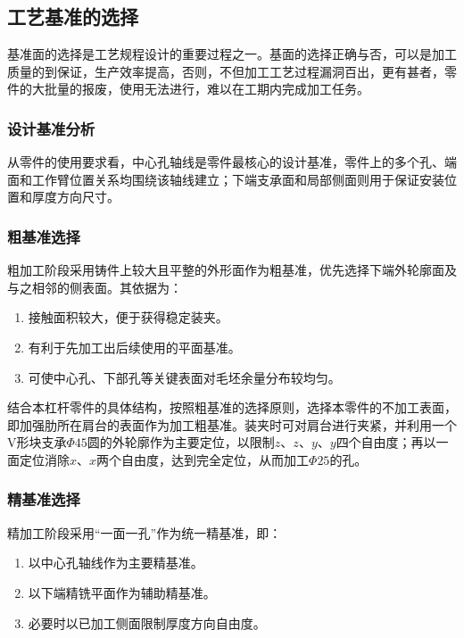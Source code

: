 \documentclass[12pt,a4paper,fontset=none]{ctexart}
\begin{document}
    \subsection{工艺基准的选择}

    基准面的选择是工艺规程设计的重要过程之一。基面的选择正确与否，可以是加工质量的到保证，生产效率提高，否则，不但加工工艺过程漏洞百出，更有甚者，零件的大批量的报废，使用无法进行，难以在工期内完成加工任务。

    \subsubsection{设计基准分析}

    从零件的使用要求看，中心孔轴线是零件最核心的设计基准，零件上的多个孔、端面和工作臂位置关系均围绕该轴线建立；下端支承面和局部侧面则用于保证安装位置和厚度方向尺寸。

    \subsubsection{粗基准选择}

    粗加工阶段采用铸件上较大且平整的外形面作为粗基准，优先选择下端外轮廓面及与之相邻的侧表面。其依据为：

    \begin{enumerate}
        \item 接触面积较大，便于获得稳定装夹。
        \item 有利于先加工出后续使用的平面基准。
        \item 可使中心孔、下部孔等关键表面对毛坯余量分布较均匀。
    \end{enumerate}

    结合本杠杆零件的具体结构，按照粗基准的选择原则，选择本零件的不加工表面，即加强肋所在肩台的表面作为加工粗基准。装夹时可对肩台进行夹紧，并利用一个V形块支承$\Phi45$圆的外轮廓作为主要定位，以限制$z$、$z$、$y$、$y$四个自由度；再以一面定位消除$x$、$x$两个自由度，达到完全定位，从而加工$\Phi25$的孔。

    \subsubsection{精基准选择}

    精加工阶段采用“一面一孔”作为统一精基准，即：

    \begin{enumerate}
        \item 以中心孔轴线作为主要精基准。
        \item 以下端精铣平面作为辅助精基准。
        \item 必要时以已加工侧面限制厚度方向自由度。
    \end{enumerate}
\end{document}
